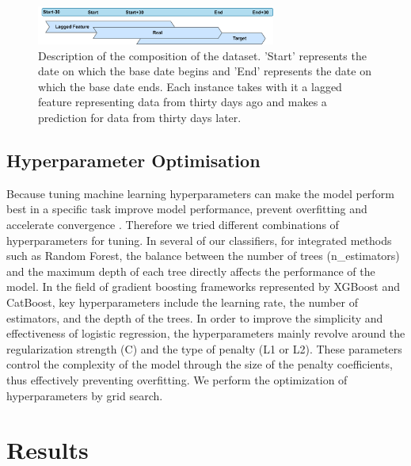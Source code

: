 \documentclass{article}
\begin{document}
\begin{figure}[h] %
  \centering
  \includegraphics[width=0.7\textwidth]{lag.drawio.png}
  \captionsetup{labelformat=default}
  \caption{Description of the composition of the dataset. 'Start' represents the date on which the base date begins and 'End' represents the date on which the base date ends. Each instance takes with it a lagged feature representing data from thirty days ago and makes a prediction for data from thirty days later.}
  \label{fig:lag}
\end{figure}

\subsection{Hyperparameter Optimisation}
Because tuning machine learning hyperparameters can make the model perform best in a specific task improve model performance, prevent overfitting and accelerate convergence \cite{hyper}. Therefore we tried different combinations of hyperparameters for tuning.
In several of our classifiers, for integrated methods such as Random Forest, the balance between the number of trees (n\_estimators) and the maximum depth of each tree directly affects the performance of the model\cite{hyperbook}. In the field of gradient boosting frameworks represented by XGBoost and CatBoost, key hyperparameters include the learning rate, the number of estimators, and the depth of the trees. In order to improve the simplicity and effectiveness of logistic regression, the hyperparameters mainly revolve around the regularization strength (C) and the type of penalty (L1 or L2). These parameters control the complexity of the model through the size of the penalty coefficients, thus effectively preventing overfitting. We perform the optimization of hyperparameters by grid search.

\section{Results}
\end{document}
